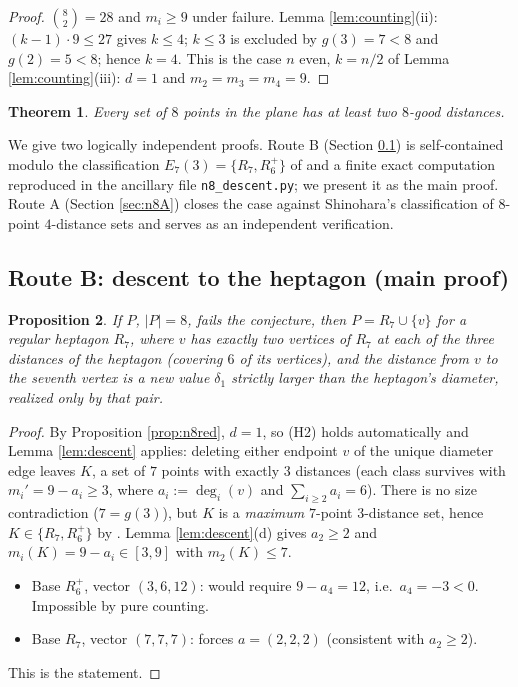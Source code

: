 \documentclass[11pt]{article}
\newtheorem{theorem}{Theorem}[section]
\newtheorem{proposition}[theorem]{Proposition}
\theoremstyle{definition}
\theoremstyle{remark}
\begin{document}
\begin{proof}
$\binom{8}{2} = 28$ and $m_i \ge 9$ under failure. Lemma \ref{lem:counting}(ii):
$(k-1) \cdot 9 \le 27$ gives $k \le 4$; $k \le 3$ is excluded by $g(3) = 7 < 8$ and
$g(2) = 5 < 8$; hence $k = 4$. This is the case $n$ even, $k = n/2$ of Lemma
\ref{lem:counting}(iii): $d = 1$ and $m_2 = m_3 = m_4 = 9$.
\end{proof}

\begin{theorem}\label{thm:n8}
Every set of $8$ points in the plane has at least two $8$-good distances.
\end{theorem}

We give two logically independent proofs. Route B (Section \ref{sec:n8B}) is
self-contained modulo the classification $E_7(3) = \{R_7, R_6^+\}$ of
\cite[Theorem~1]{ErFi96} and a finite exact computation reproduced in the ancillary file
\texttt{n8\_descent.py}; we present it as the main proof. Route A (Section
\ref{sec:n8A}) closes the case against Shinohara's classification of $8$-point
$4$-distance sets \cite{Shinohara08} and serves as an independent verification.

\subsection{Route B: descent to the heptagon (main proof)}\label{sec:n8B}

\begin{proposition}\label{prop:n8descent}
If $P$, $|P| = 8$, fails the conjecture, then $P = R_7 \cup \{v\}$ for a regular
heptagon $R_7$, where $v$ has exactly two vertices of $R_7$ at each of the three
distances of the heptagon (covering $6$ of its vertices), and the distance from $v$ to
the seventh vertex is a new value $\delta_1$ strictly larger than the heptagon's
diameter, realized only by that pair.
\end{proposition}

\begin{proof}
By Proposition \ref{prop:n8red}, $d = 1$, so (H2) holds automatically and Lemma
\ref{lem:descent} applies: deleting either endpoint $v$ of the unique diameter edge
leaves $K$, a set of $7$ points with exactly $3$ distances (each class survives with
$m_i' = 9 - a_i \ge 3$, where $a_i := \deg_i(v)$ and $\sum_{i \ge 2} a_i = 6$). There is
no size contradiction ($7 = g(3)$), but $K$ is a \emph{maximum} $7$-point $3$-distance
set, hence $K \in \{R_7, R_6^+\}$ by \cite[Theorem~1]{ErFi96}. Lemma
\ref{lem:descent}(d) gives $a_2 \ge 2$ and $m_i(K) = 9 - a_i \in [3, 9]$ with
$m_2(K) \le 7$.
\begin{itemize}
\item Base $R_6^+$, vector $(3, 6, 12)$: would require $9 - a_4 = 12$, i.e.\ $a_4 = -3 <
0$. Impossible by pure counting.
\item Base $R_7$, vector $(7,7,7)$: forces $a = (2,2,2)$ (consistent with $a_2 \ge 2$).
\end{itemize}
This is the statement.
\end{proof}
\end{document}
